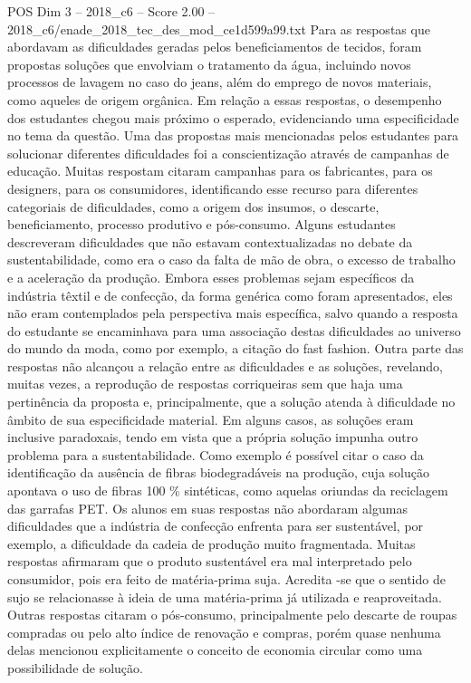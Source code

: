 \begin{textsample}{POS Dim 3 – 2018\_c6 – Score 2.00 – 2018\_c6/enade\_2018\_tec\_des\_mod\_ce1d599a99.txt}
Para as respostas que abordavam as dificuldades geradas pelos beneficiamentos de tecidos, foram propostas soluções que envolviam o tratamento da água, incluindo novos processos de lavagem no caso do jeans, além do emprego de novos materiais, como aqueles de origem orgânica.
Em relação a essas respostas, o desempenho dos estudantes chegou mais próximo o esperado, evidenciando uma especificidade no tema da questão.
Uma das propostas mais mencionadas pelos estudantes para solucionar diferentes dificuldades foi a conscientização através de campanhas de educação.
Muitas respostam citaram campanhas para os fabricantes, para os designers, para os consumidores, identificando esse recurso para diferentes categoriais de dificuldades, como a origem dos insumos, o descarte, beneficiamento, processo produtivo e pós-consumo.
Alguns estudantes descreveram dificuldades que não estavam contextualizadas no debate da sustentabilidade, como era o caso da falta de mão de obra, o excesso de trabalho e a aceleração da produção.
Embora esses problemas sejam específicos da indústria têxtil e de confecção, da forma genérica como foram apresentados, eles não eram contemplados pela perspectiva mais específica, salvo quando a resposta do estudante se encaminhava para uma associação destas dificuldades ao universo do mundo da moda, como por exemplo, a citação do fast fashion.
Outra parte das respostas não alcançou a relação entre as dificuldades e as soluções, revelando, muitas vezes, a reprodução de respostas corriqueiras sem que haja uma pertinência da proposta e, principalmente, que a solução atenda à dificuldade no âmbito de sua especificidade material.
Em alguns casos, as soluções eram inclusive paradoxais, tendo em vista que a própria solução impunha outro problema para a sustentabilidade.
Como exemplo é possível citar o caso da identificação da ausência de fibras biodegradáveis na produção, cuja solução apontava o uso de fibras 100 \% sintéticas, como aquelas oriundas da reciclagem das garrafas PET.
Os alunos em suas respostas não abordaram algumas dificuldades que a indústria de confecção enfrenta para ser sustentável, por exemplo, a dificuldade da cadeia de produção muito fragmentada.
Muitas respostas afirmaram que o produto sustentável era mal interpretado pelo consumidor, pois era feito de matéria-prima suja.
Acredita -se que o sentido de sujo se relacionasse à ideia de uma matéria-prima já utilizada e reaproveitada.
Outras respostas citaram o pós-consumo, principalmente pelo descarte de roupas compradas ou pelo alto índice de renovação e compras, porém quase nenhuma delas mencionou explicitamente o conceito de economia circular como uma possibilidade de solução.

\end{textsample}
